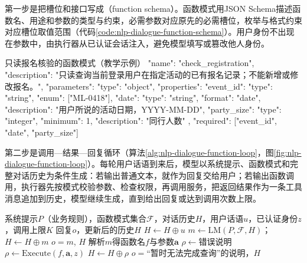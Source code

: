 第一步是把槽位和接口写成（function schema）。函数模式用JSON Schema描述函数名、用途和参数的类型与约束，必需参数对应原先的必需槽位，枚举与格式约束对应槽位取值范围（代码\ref{code:nlp-dialogue-function-schema}）。用户身份不出现在参数中，由执行器从已认证会话注入，避免模型填写或篡改他人身份。

\begin{codeblock}[label={code:nlp-dialogue-function-schema}]{只读报名核验的函数模式（教学示例）}
{
  "name": "check_registration",
  "description": "只读查询当前登录用户在指定活动的已有报名记录；不能新增或修改报名。",
  "parameters": {
    "type": "object",
    "properties": {
      "event_id":   {"type": "string", "enum": ["ML-0418"]},
      "date":       {"type": "string", "format": "date",
                     "description": "用户所说的活动日期，YYYY-MM-DD"},
      "party_size": {"type": "integer", "minimum": 1,
                     "description": "同行人数"}
    },
    "required": ["event_id", "date", "party_size"]
  }
}
\end{codeblock}

第二步是调用—结果—回复循环（算法\ref{alg:nlp-dialogue-function-loop}，图\ref{fig:nlp-dialogue-function-loop}）。每轮用户话语到来后，模型以系统提示、函数模式和完整对话历史为条件生成：若输出普通文本，就作为回复交给用户；若输出函数调用，执行器先按模式校验参数、检查权限，再调用服务，把返回结果作为一条工具消息追加到历史，模型继续生成，直到给出回复或达到调用次数上限。

\begin{algorithm}[函数调用式任务型对话的单轮处理]
  \label{alg:nlp-dialogue-function-loop}
  \begin{algorithmic}[1]
    \Require 系统提示$P$（业务规则），函数模式集合$\mathcal{F}$，对话历史$H$，用户话语$u$，已认证身份$z$，调用上限$K$
    \Ensure 回复$o$，更新后的历史$H$
    \State $H\gets H\oplus u$
      \State $m\gets\mathrm{LM}(P,\mathcal{F},H)$；$H\gets H\oplus m$
        \State \Return $o=m$, $H$
      \EndIf
      \State 解析$m$得函数名$f$与参数$\bm{a}$
        \State $\rho\gets$错误说明
      \Else
        \State $\rho\gets\mathrm{Execute}(f,\bm{a},z)$
      \EndIf
      \State $H\gets H\oplus\rho$
    \EndFor
    \State \Return $o=$“暂时无法完成查询”的说明，$H$
  \end{algorithmic}
\end{algorithm}

